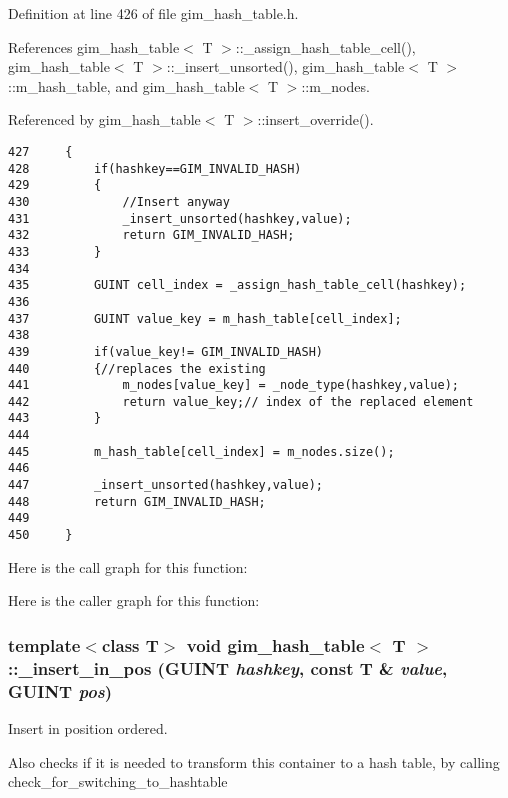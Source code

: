 Definition at line 426 of file gim\_\-hash\_\-table.h.

References gim\_\-hash\_\-table$<$ T $>$::\_\-assign\_\-hash\_\-table\_\-cell(), gim\_\-hash\_\-table$<$ T $>$::\_\-insert\_\-unsorted(), gim\_\-hash\_\-table$<$ T $>$::m\_\-hash\_\-table, and gim\_\-hash\_\-table$<$ T $>$::m\_\-nodes.

Referenced by gim\_\-hash\_\-table$<$ T $>$::insert\_\-override().

\begin{Code}\begin{verbatim}427     {
428         if(hashkey==GIM_INVALID_HASH)
429         {
430             //Insert anyway
431             _insert_unsorted(hashkey,value);
432             return GIM_INVALID_HASH;
433         }
434 
435         GUINT cell_index = _assign_hash_table_cell(hashkey);
436 
437         GUINT value_key = m_hash_table[cell_index];
438 
439         if(value_key!= GIM_INVALID_HASH)
440         {//replaces the existing
441             m_nodes[value_key] = _node_type(hashkey,value);
442             return value_key;// index of the replaced element
443         }
444 
445         m_hash_table[cell_index] = m_nodes.size();
446 
447         _insert_unsorted(hashkey,value);
448         return GIM_INVALID_HASH;
449 
450     }
\end{verbatim}
\end{Code}




Here is the call graph for this function:

Here is the caller graph for this function:\hypertarget{classgim__hash__table_3eacaf88e1b18815c0b89d368d77a93a}{
\subsubsection[\_\-insert\_\-in\_\-pos]{\setlength{\rightskip}{0pt plus 5cm}template$<$class T$>$ void {\bf gim\_\-hash\_\-table}$<$ T $>$::\_\-insert\_\-in\_\-pos (GUINT {\em hashkey}, \/  const T \& {\em value}, \/  GUINT {\em pos})}}
\label{classgim__hash__table_3eacaf88e1b18815c0b89d368d77a93a}


Insert in position ordered. 

Also checks if it is needed to transform this container to a hash table, by calling check\_\-for\_\-switching\_\-to\_\-hashtable 


